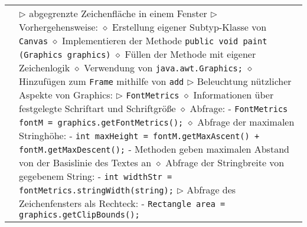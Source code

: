 \begin{longtable}{ | p{} p{} | }
	\makecell[l]{Klasse Canvas} & \makecell[l]{
	$\rhd$ abgegrenzte Zeichenfläche in einem Fenster \\
	$\rhd$ Vorhergehensweise: \\
	\hspace{0.4cm} $\diamond$ Erstellung eigener Subtyp-Klasse von \texttt{Canvas} \\
	\hspace{0.4cm} $\diamond$ Implementieren der Methode \texttt{public void paint (Graphics graphics)} \\
	\hspace{0.4cm} $\diamond$ Füllen der Methode mit eigener Zeichenlogik \\
	\hspace{0.4cm} $\diamond$ Verwendung von \texttt{java.awt.Graphics;} \\
	\hspace{0.4cm} $\diamond$ Hinzufügen zum \texttt{Frame} mithilfe von \texttt{add} \\
	$\rhd$ Beleuchtung nützlicher Aspekte von Graphics: \\
	$\rhd$ \texttt{FontMetrics} \\
	\hspace{0.4cm} $\diamond$ Informationen über festgelegte Schriftart und Schriftgrö\ss e \\
	\hspace{0.4cm} $\diamond$ Abfrage: \\
	\hspace{0.6cm} - \texttt{FontMetrics fontM = graphics.getFontMetrics();} \\
	\hspace{0.4cm} $\diamond$ Abfrage der maximalen Stringhöhe: \\
	\hspace{0.6cm} - \texttt{int maxHeight = fontM.getMaxAscent() + fontM.getMaxDescent();} \\
	\hspace{0.6cm} - Methoden geben maximalen Abstand von der Basislinie des Textes an \\
	\hspace{0.4cm} $\diamond$ Abfrage der Stringbreite von gegebenem String: \\
	\hspace{0.6cm} - \texttt{int widthStr = fontMetrics.stringWidth(string);} \\
	$\rhd$ Abfrage des Zeichenfensters als Rechteck: \\
	\hspace{0.6cm} - \texttt{Rectangle area = graphics.getClipBounds();} \\
}
\end{longtable}
